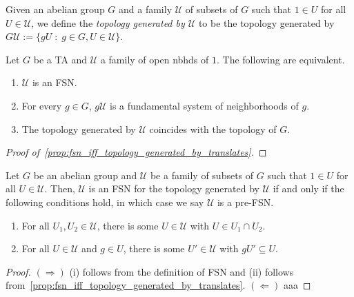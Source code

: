 \begin{definition} Given an abelian group $G$ and a family $\mathcal{U}$ of subsets of $G$ such that $1 \in U$ for all $U \in \mathcal{U}$, we define the \emph{topology generated by $\mathcal{U}$} to be the topology generated by $G \mathcal{U} := \{gU \;:\; g \in G, U \in \mathcal{U}\}$.
\end{definition}


\begin{proposition}\label{prop:fsn_iff_topology_generated_by_translates} Let $G$ be a TA and $\mathcal{U}$ a family of open nbhds of $1$. The following are equivalent.
\begin{enumerate}
\item[(i)] $\mathcal{U}$ is an FSN.
\item[(ii)] For every $g \in G$, $g\mathcal{U}$ is a fundamental system of neighborhoods of $g$.
\item[(iii)] The topology generated by $\mathcal{U}$ coincides with the topology of $G$.
\end{enumerate}
\end{proposition}
\begin{proof}[Proof of~\cref{prop:fsn_iff_topology_generated_by_translates}] \TODO %
\end{proof}


\begin{proposition} Let $G$ be an abelian group and $\mathcal{U}$ be a family of subsets of $G$ such that $1 \in U$ for all $U \in \mathcal{U}$. Then, $\mathcal{U}$ is an FSN for the topology generated by $\mathcal{U}$ if and only if the following conditions hold, in which case we say $\mathcal{U}$ is a pre-FSN.
\begin{enumerate}
    \item[(i)] For all $U_1, U_2 \in \mathcal{U}$, there is some $U \in \mathcal{U}$ with $U \in U_1 \cap U_2$.
    \item[(ii)] For all $U \in \mathcal{U}$ and $g \in U$, there is some $U' \in \mathcal{U}$ with $gU' \subseteq U$.
\end{enumerate}
\end{proposition}
\begin{proof} $(\Rightarrow)$ (i) follows from the definition of FSN and (ii) follows from~\cref{prop:fsn_iff_topology_generated_by_translates}. $(\Leftarrow)$ aaa \TODO
\end{proof}


